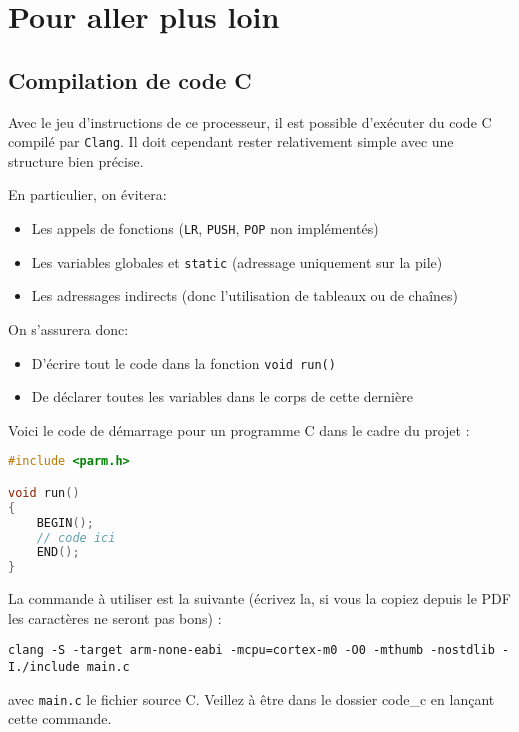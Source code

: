 \documentclass{article}
\begin{document}
    \section{Pour aller plus loin}

    \subsection{Compilation de code C}
    Avec le jeu d'instructions de ce processeur, il est possible d'exécuter du code C compilé par \texttt{Clang}.
    Il doit cependant rester relativement simple avec une structure bien précise.

    En particulier, on évitera:
    \begin{itemize}
        \item Les appels de fonctions (\texttt{LR}, \texttt{PUSH}, \texttt{POP} non implémentés)
        \item Les variables globales et \texttt{static} (adressage uniquement sur la pile)
        \item Les adressages indirects (donc l'utilisation de tableaux ou de chaînes)
    \end{itemize}

    On s'assurera donc:
    \begin{itemize}
        \item D'écrire tout le code dans la fonction \texttt{void run()}
        \item De déclarer toutes les variables dans le corps de cette dernière
    \end{itemize}
    
    Voici le code de démarrage pour un programme C dans le cadre du projet :
     \begin{lstlisting}[language=C]
#include <parm.h>

void run()
{
	BEGIN();
	// code ici	
	END();
}
    \end{lstlisting}

    La commande à utiliser est la suivante (écrivez la, si vous la copiez depuis le PDF les caractères ne seront pas bons) :
    \begin{lstlisting}
clang -S -target arm-none-eabi -mcpu=cortex-m0 -O0 -mthumb -nostdlib -I./include main.c
    \end{lstlisting}
    avec \texttt{main.c} le fichier source C. Veillez à être dans le dossier code\_c en lançant cette commande.
\end{document}
